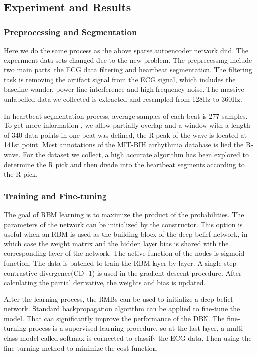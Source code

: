 \documentclass{bmcart}
\begin{document}
\subsection*{Experiment  and Results}
\subsubsection*{Preprocessing and Segmentation}
Here we do the same process as the above sparse autoencoder network diid. The experiment data sets changed due to the new problem. The preprocessing include two main parts: the ECG data filtering and heartbeat segmentation. The filtering task is removing the artifact signal from the ECG signal, which includes the baseline wander, power line interference and high-frequency noise. The  massive unlabelled data we collected is extracted and resampled from 128Hz to 360Hz. 

In heartbeat segmentation process, average samples of each beat is 277 samples. To get more information , we allow partially overlap and a window with a length of 340 data points in one beat was defined, the R peak of the wave is located at 141st point. Most annotations of the MIT-BIH arrhythmia database is lied the R-wave. For the dataset we collect, a high accurate algorithm has been explored to determine the R pick and then divide into the heartbeat segments according to the R pick.

\subsubsection*{Training and Fine-tuning}
The goal of RBM learning is to maximize the product of the probabilities. The parameters of the network can be initialized by the constructor. This option is useful when an RBM is used as the building block of the deep belief network, in which case the weight matrix and the hidden layer bias is shared with the corresponding layer of the network. The active function of the nodes is sigmoid function. The data is batched to train the RBM layer by layer. A single-step contrastive divergence(CD- 1) is used in the gradient descent procedure. After calculating the partial derivative, the weights and bias is updated.

After the learning process, the RMBs can be used to initialize a deep belief network. Standard backpropagation algorithm can be applied to fine-tune the model. That can significantly improve the performance of the DBN. The fine- turning process is a supervised learning procedure, so at the last layer, a multi-class model called softmax is connected to classify the ECG data. Then using the fine-turning method to minimize the cost function.
\end{document}
